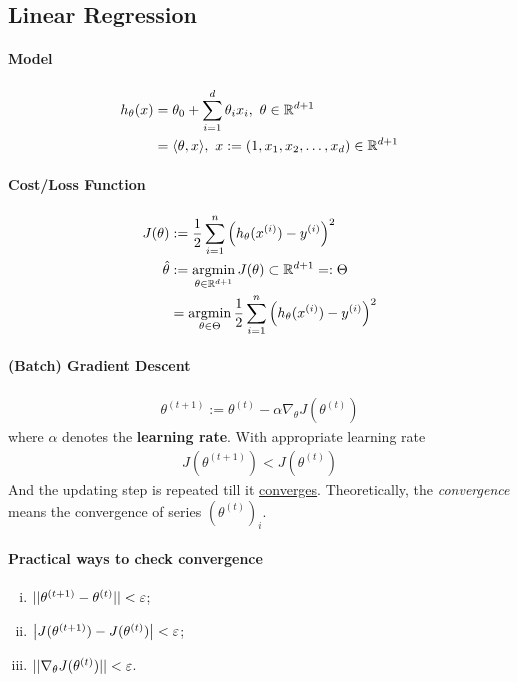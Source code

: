 \documentclass{report}
\begin{document}
        \subsection{Linear Regression}
        \paragraph{Model}
        \begin{align}
            h_\theta(x) &= \theta_0 + \sum_{i=1}^d \theta_i x_i,\ \theta \in \R^{d+1} \\
            &= \inner{\theta}{x},\ x := (1, x_1, x_2, \dots, x_d) \in \R^{d+1}
        \end{align}
        
        \paragraph{Cost/Loss Function}
        \begin{align}
            J(\theta) &:= \frac{1}{2} \sum_{i=1}^n \left(
                h_\theta(x^{(i)}) - y^{(i)}
            \right )^2 \\
            \hat{\theta} &:= \operatorname*{argmin}_{\theta \in \mathbb{R}^{d+1}} J(\theta) \subset \mathbb{R}^{d+1} =: \Theta\\
            &= \operatorname*{argmin}_{\theta \in \Theta} \frac{1}{2} \sum_{i=1}^n \left(h_\theta(x^{(i)}) - y^{(i)}\right)^2
        \end{align}
        
        \paragraph{(Batch) Gradient Descent}
        \begin{align}
            \theta^{(t+1)} := \theta^{(t)} - \alpha \nabla_\theta J(\theta^{(t)})
        \end{align}
        where $\alpha$ denotes the \textbf{learning rate}. With appropriate learning rate
        \begin{align}
            J(\theta^{(t + 1)}) < J(\theta^{(t)})
        \end{align}
        And the updating step is repeated till it \ul{converges}. Theoretically, the \emph{convergence} means the convergence of series $(\theta^{(t)})_i$.\\
        \paragraph{Practical ways to check convergence}
        \begin{enumerate}[(i)]
            \item $\vert \vert {\theta^{(t+1)} - \theta^{(t)}} \vert \vert < \varepsilon$;
            \item $\big \vert {J(\theta^{(t+1)}) - J(\theta^{(t)})} \big \vert < \varepsilon$;
            \item $\vert \vert {\nabla_\theta J(\theta^{(t)})} \vert \vert < \varepsilon$.
        \end{enumerate}
        
\end{document}
